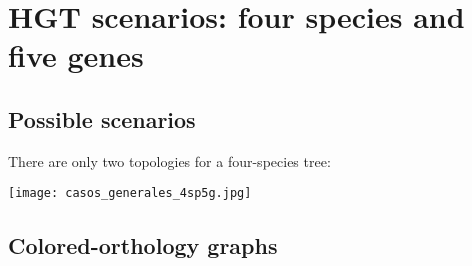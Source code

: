 \documentclass[10pt,a4paper,notitlepage]{report}
\begin{document}
%
%
%			
%		
%		
%		
%		
\section*{HGT scenarios: four species and five genes}	

\subsection{Possible scenarios}

There are only two topologies for a four-species tree:
	\begin{center}
		\texttt{[image: casos\_generales\_4sp5g.jpg]}
	\end{center}


\subsection{Colored-orthology graphs}
\end{document}
